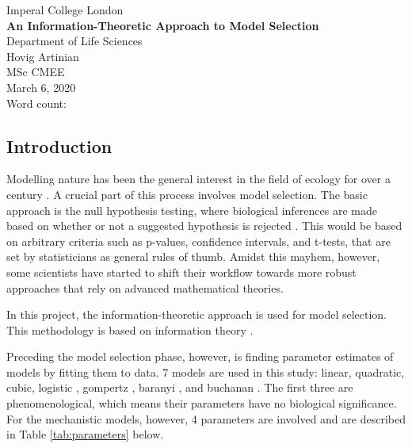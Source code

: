 \documentclass[11pt]{article}
\newcommand\wordcount{}
\begin{document}
	\begin{titlepage}
		\centering
		\vspace*{\fill}
		Imperal College London\\
		\textbf{An Information-Theoretic Approach to Model Selection}\\
		Department of Life Sciences\\
		\hfill \break
		\hfill \break
		Hovig Artinian\\
		MSc CMEE\\
		March 6, 2020\\
		Word count: \wordcount
		\vspace*{\fill}
	\end{titlepage}


	\tableofcontents
	
	\newpage
	\begin{linenumbers}
	\section{Introduction}

	Modelling nature has been the general interest in the field of ecology for over a century \cite{Kingsland1995}. A crucial part of this process involves model selection. The basic approach is the null hypothesis testing, where biological inferences are made based on whether or not a suggested hypothesis is rejected \cite{Johnson2004}. This would be based on arbitrary criteria such as p-values, confidence intervals, and t-tests, that are set by statisticians as general rules of thumb. Amidst this mayhem, however, some scientists have started to shift their workflow towards more robust approaches that rely on advanced mathematical theories.
	\par In this project, the information-theoretic approach is used for model selection. This methodology is based on information theory \cite{Guiasu1977}.
	\par Preceding the model selection phase, however, is finding parameter estimates of models by fitting them to data. 7 models are used in this study: linear, quadratic, cubic, logistic \cite{Pearl1920}, gompertz \cite{Zwietering1990}, baranyi \cite{Baranyi1994}, and buchanan \cite{Buchanan1997}. The first three are phenomenological, which means their parameters have no biological significance. For the mechanistic models, however, 4 parameters are involved and are described in Table \ref{tab:parameters} below.
	

\end{linenumbers}
\end{document}
